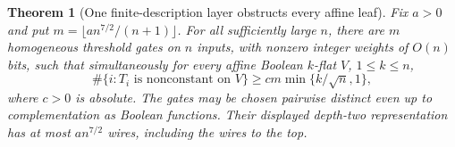 \documentclass[11pt,letterpaper]{article}
\newtheorem{theorem}{Theorem}[section]
\theoremstyle{definition}
\theoremstyle{remark}
\begin{document}
\begin{theorem}[One finite-description layer obstructs every affine leaf]
\label{lim:all-affine}
Fix $a>0$ and put
$m=\lfloor a n^{7/2}/(n+1)\rfloor$.
For all sufficiently large $n$, there are $m$ homogeneous threshold gates
on $n$ inputs, with nonzero integer weights of $O(n)$ bits, such that
simultaneously for every affine Boolean $k$-flat $V$, $1\le k\le n$,
\begin{equation}
 \#\{i:T_i\text{ is nonconstant on }V\}
 \ge c m\min\{k/\sqrt n,1\},
 \label{lim:all-affine-bound}
\end{equation}
where $c>0$ is absolute.  The gates may be chosen pairwise distinct even up
to complementation as Boolean functions.  Their displayed depth-two
representation has at most $a n^{7/2}$ wires, including the wires to the top.
\end{theorem}
\end{document}
